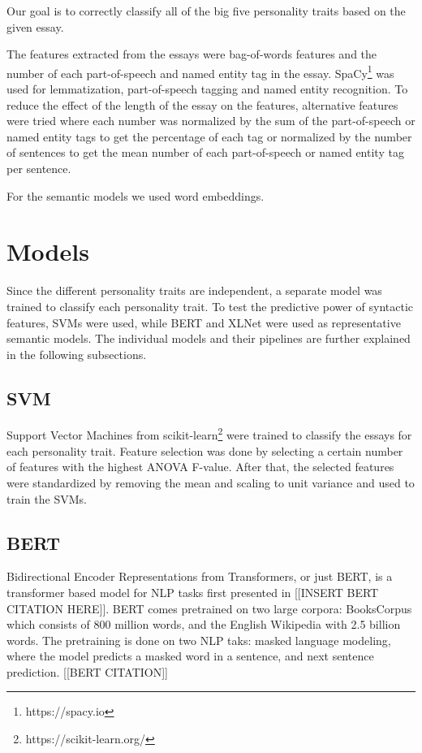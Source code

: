 \documentclass[10pt, a4paper]{article}
\begin{document}
Our goal is to correctly classify all of the big five personality traits based on the given essay.

The features extracted from the essays were bag-of-words features and the number of each part-of-speech and named entity tag in the essay.
SpaCy\footnote{https://spacy.io} was used for lemmatization, part-of-speech tagging and named entity recognition.
To reduce the effect of the length of the essay on the features, alternative features were tried where each number was normalized by the sum of the part-of-speech or named entity tags to get the percentage of each tag or normalized by the number of sentences to get the mean number of each part-of-speech or named entity tag per sentence.

For the semantic models we used word embeddings.

\section{Models}

Since the different personality traits are independent, a separate model was trained to classify each personality trait.
To test the predictive power of syntactic features, SVMs were used, while BERT and XLNet were used as representative semantic models.
The individual models and their pipelines are further explained in the following subsections.

\subsection{SVM}

Support Vector Machines from scikit-learn\footnote{https://scikit-learn.org/} were trained to classify the essays for each personality trait.
Feature selection was done by selecting a certain number of features with the highest ANOVA F-value.
After that, the selected features were standardized by removing the mean and scaling to unit variance and used to train the SVMs.

\subsection{BERT}

Bidirectional Encoder Representations from Transformers, or just BERT, is a transformer based model for NLP tasks first presented in [[INSERT BERT CITATION HERE]]. 
BERT comes pretrained on two large corpora: BooksCorpus which consists of 800 million words, and the English Wikipedia with 2.5 billion words. 
The pretraining is done on two NLP taks: masked language modeling, where the model predicts a masked word in a sentence, and next sentence prediction. [[BERT CITATION]]
\end{document}
